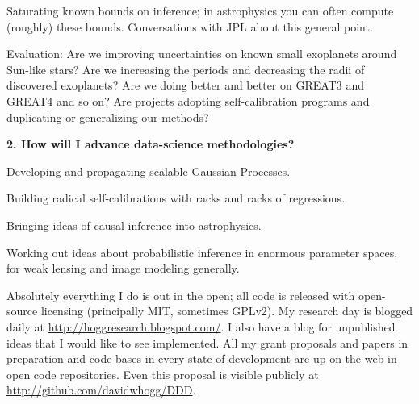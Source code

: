 \documentclass[11pt, letterpaper]{article}
\begin{document}
Saturating known bounds on inference; in astrophysics you can often
compute (roughly) these bounds.  Conversations with JPL about this
general point.

Evaluation: Are we improving uncertainties on known small exoplanets
around Sun-like stars?  Are we increasing the periods and decreasing
the radii of discovered exoplanets?  Are we doing better and better on
GREAT3 and GREAT4 and so on?  Are projects adopting self-calibration
programs and duplicating or generalizing our methods?

\bigskip
\noindent\textbf{2. How will I advance data-science methodologies?}
\smallskip

Developing and propagating scalable Gaussian Processes.

Building radical self-calibrations with racks and racks of regressions.

Bringing ideas of causal inference into astrophysics.

Working out ideas about probabilistic inference in enormous parameter spaces,
for weak lensing and image modeling generally.

Absolutely everything I do is out in the open; all code is released
with open-source licensing (principally MIT, sometimes GPLv2).
My research day is blogged daily at
\url{http://hoggresearch.blogspot.com/}.
I also have a blog for unpublished ideas that I would like to see
implemented.
All my grant proposals and papers in preparation and code bases in
every state of development are up on the web in open code
repositories.
Even this proposal is visible publicly at
\url{http://github.com/davidwhogg/DDD}.
\end{document}

